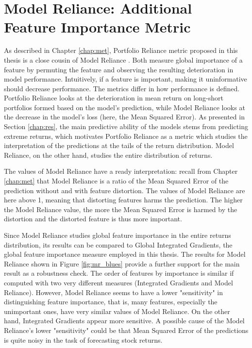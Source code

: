 \chapter{Model Reliance: Additional Feature Importance Metric}
\label{chap:additional_metrics} 

As described in Chapter \ref{chap:met}, Portfolio Reliance metric proposed in this thesis is a close cousin of Model Reliance \citep{fisher2019all}. Both measure global importance of a feature by permuting the feature and observing the resulting deterioration in model performance. Intuitively, if a feature is important, making it uninformative should decrease performance. The metrics differ in how performance is defined. Portfolio Reliance looks at the deterioration in mean return on long-short portfolios formed based on the model's prediction, while Model Reliance looks at the decrease in the model's loss (here, the Mean Squared Error). As presented in Section \ref{chap:res}, the main predictive ability of the models stems from predicting extreme returns, which motivates Portfolio Reliance as a metric which studies the interpretation of the predictions at the tails of the return distribution. Model Reliance, on the other hand, studies the entire distribution of returns.

The values of Model Reliance have a ready interpretation: recall from Chapter \ref{chap:met} that Model Reliance is a ratio of the Mean Squared Error of the prediction without and with feature distortion. The values of Model Reliance are here above 1, meaning that distorting features harms the prediction. The higher the Model Reliance value, the more the Mean Squared Error is harmed by the distortion and the distorted feature is thus more important.

Since Model Reliance studies global feature importance in the entire returns distribution, its results can be compared to Global Integrated Gradients, the global feature importance measure employed in this thesis. The results for Model Reliance shown in Figure \ref{fig:mr_blues} provide a further support for the main result as a robustness check. The order of features by importance is similar if computed with two very different measures (Integrated Gradients and Model Reliance). However, Model Reliance seems to have a lower "sensitivity" in distinguishing feature importance, that is, many features, especially the unimportant ones, have very similar values of Model Reliance. On the other hand, Integrated Gradients appear more sensitive. A possible cause of the Model Reliance's lower "sensitivity" could be that Mean Squared Error of the predictions is quite noisy in the task of forecasting stock returns.
 

